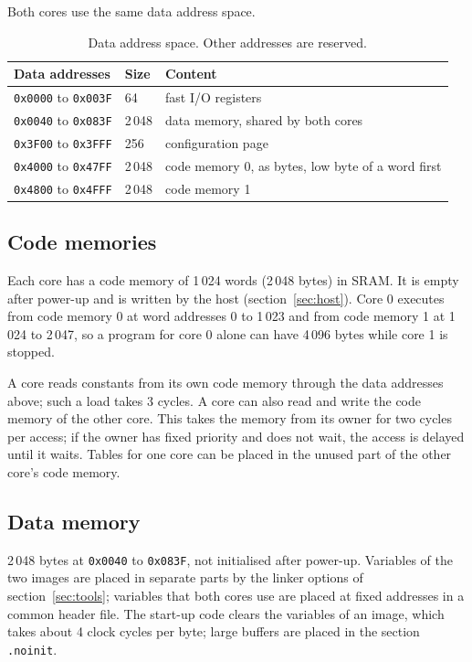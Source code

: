 \documentclass[10pt,a4paper]{article}
\begin{document}
Both cores use the same data address space.

\begin{table}[H]
\centering\small
\begin{tabularx}{\linewidth}{@{}llL@{}}
\toprule
Data addresses & Size & Content \\
\midrule
\texttt{0x0000} to \texttt{0x003F} & 64 & fast I/O registers \\
\texttt{0x0040} to \texttt{0x083F} & 2\,048 & data memory, shared by both cores \\
\texttt{0x3F00} to \texttt{0x3FFF} & 256 & configuration page \\
\texttt{0x4000} to \texttt{0x47FF} & 2\,048 & code memory 0, as bytes, low byte of a word first \\
\texttt{0x4800} to \texttt{0x4FFF} & 2\,048 & code memory 1 \\
\bottomrule
\end{tabularx}
\caption{Data address space. Other addresses are reserved.}
\end{table}

\subsection{Code memories}

Each core has a code memory of 1\,024 words (2\,048 bytes) in SRAM. It is empty after power-up and is written by
the host (section~\ref{sec:host}). Core 0 executes from code memory 0 at word addresses 0 to 1\,023 and from code
memory 1 at 1\,024 to 2\,047, so a program for core 0 alone can have 4\,096 bytes while core 1 is stopped.

A core reads constants from its own code memory through the data addresses above; such a load takes 3 cycles.
A core can also read and write the code memory of the other core. This takes the memory from its owner for
two cycles per access; if the owner has fixed priority and does not wait, the access is delayed until it
waits. Tables for one core can be placed in the unused part of the other core's code memory.

\subsection{Data memory}

2\,048 bytes at \texttt{0x0040} to \texttt{0x083F}, not initialised after power-up. Variables of the two images are
placed in separate parts by the linker options of section~\ref{sec:tools}; variables that both cores use are placed
at fixed addresses in a common header file. The start-up code clears the variables of an image, which takes
about 4 clock cycles per byte; large buffers are placed in the section \texttt{.noinit}.
\end{document}
